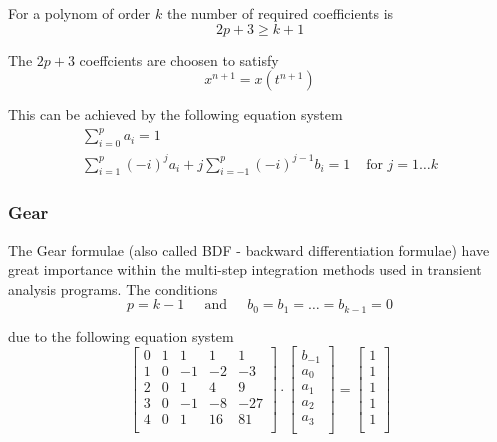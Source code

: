 For a polynom of order $k$ the number of required coefficients is
\begin{equation}
2p + 3 \ge k + 1
\end{equation}

The $2p +3$ coeffcients are choosen to satisfy
\begin{equation}
x^{n+1} = x(t^{n+1})
\end{equation}

This can be achieved by the following equation system
\begin{equation}
\begin{split}
\label{eq:MultiStepSys}
\sum^p_{i=0} a_i = 1\\
\sum^p_{i=1} (-i)^j a_i + j \sum^p_{i=-1} (-i)^{j-1} b_i = 1 & \textrm{ for } j = 1\ldots k
\end{split}
\end{equation}

\subsubsection{Gear}

The Gear \cite{Gear} formulae (also called BDF - backward
differentiation formulae) have great importance within the multi-step
integration methods used in transient analysis programs.  The
conditions
\begin{equation}
p = k - 1
\;\;\;\; \textrm{ and } \;\;\;\;
b_0 = b_1 = \ldots = b_{k-1} = 0
\end{equation}

due to the following equation system
\begin{equation}
\label{eq:GearCoeff}
\left[\begin{array}{lrrrr}
0 & 1 &  1 &  1 &   1\\
1 & 0 & -1 & -2 &  -3\\
2 & 0 &  1 &  4 &   9\\
3 & 0 & -1 & -8 & -27\\
4 & 0 &  1 & 16 &  81\\
\end{array}\right]
\cdot
\begin{bmatrix}
b_{-1}\\
a_0\\
a_1\\
a_2\\
a_3\\
\end{bmatrix}
=
\begin{bmatrix}
1\\
1\\
1\\
1\\
1\\
\end{bmatrix}
\end{equation}

